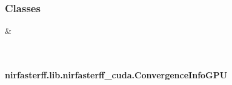 \documentclass[letterpaper,10pt,english]{sphinxmanual}
\begin{document}
\subsubsection*{Classes}


\begin{savenotes}\sphinxattablestart
\sphinxthistablewithglobalstyle
\sphinxthistablewithnovlinesstyle
\centering
\begin{tabulary}{\linewidth}[t]{}
\sphinxtoprule
\sphinxtableatstartofbodyhook
\sphinxAtStartPar
{\hyperref[\detokenize{_autosummary/nirfasterff.lib.nirfasterff_cuda.ConvergenceInfoGPU:nirfasterff.lib.nirfasterff_cuda.ConvergenceInfoGPU}]{}}
&
\sphinxAtStartPar

\\
\sphinxbottomrule
\end{tabulary}
\sphinxtableafterendhook\par
\sphinxattableend\end{savenotes}

\sphinxstepscope


\paragraph{nirfasterff.lib.nirfasterff\_cuda.ConvergenceInfoGPU}
\label{\detokenize{_autosummary/nirfasterff.lib.nirfasterff_cuda.ConvergenceInfoGPU:nirfasterff-lib-nirfasterff-cuda-convergenceinfogpu}}\label{\detokenize{_autosummary/nirfasterff.lib.nirfasterff_cuda.ConvergenceInfoGPU::doc}}
\end{document}
